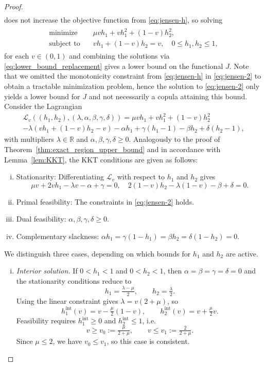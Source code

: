 \documentclass{article}
\newcommand{\1}{\mathds{1}}
\newcommand{\R}{\mathbb{R}}
\begin{document}
\begin{proof}
\begin{align}
\end{align}
does not increase the objective function from \eqref{eq:jensen-h}, so solving
\begin{align}\begin{aligned}\label{eq:jensen-2}
    \text{minimize} \quad & \mu v h_1 + v h_1^2 + (1-v)h_2^2, \\
    \text{subject to} \quad
    & v h_1 + (1-v) h_2 = v, \quad 0\le h_1, h_2 \le 1, 
\end{aligned}\end{align}
for each $v\in(0,1)$ and combining the solutions via \eqref{eq:lower_bound_replacement} gives a lower bound on the functional $J$.
Note that we omitted the monotonicity constraint from \eqref{eq:jensen-h} in \eqref{eq:jensen-2} to obtain a tractable minimization problem, hence the solution to \eqref{eq:jensen-2} only yields a lower bound for $J$ and not necessarily a copula attaining this bound.
Consider the Lagrangian
\begin{multline*}
\mathcal{L}_v((h_1,h_2),(\lambda,\alpha,\beta,\gamma,\delta))
= \mu v h_1 + v h_1^2 + (1-v) h_2^2 \\
- \lambda(v h_1+(1-v)h_2-v) - \alpha h_1 + \gamma(h_1-1) - \beta h_2 + \delta(h_2-1),
\end{multline*}
with multipliers $\lambda\in\R$ and $\alpha,\beta,\gamma,\delta\ge0$.
Analogously to the proof of Theorem~\ref{thm:exact_region_upper_bound} and in accordance with Lemma~\ref{lem:KKT}, the KKT conditions are given as follows:
\begin{enumerate}[(i)]
\item Stationarity: Differentiating $\mathcal{L}_v$ with respect to $h_1$ and $h_2$ gives
\[
\mu v + 2 v h_1 - \lambda v - \alpha + \gamma=0, 
\quad
2(1-v)h_2 - \lambda(1-v) - \beta + \delta=0.
\]
\item Primal feasibility: The constraints in \eqref{eq:jensen-2} holds.
\item Dual feasibility: $\alpha,\beta,\gamma,\delta\ge0$.
\item Complementary slackness: $\alpha h_1=\gamma(1-h_1)=\beta h_2=\delta(1-h_2)=0$.
\end{enumerate}
We distinguish three cases, depending on which bounds for $h_1$ and $h_2$ are active.
\begin{enumerate}[(i)]
\item \emph{Interior solution.}  
If $0<h_1<1$ and $0<h_2<1$, then $\alpha=\beta=\gamma=\delta=0$ and the 
stationarity conditions reduce to
\[
h_1=\tfrac{\lambda-\mu}{2}, \qquad h_2=\tfrac{\lambda}{2}.
\]
Using the linear constraint gives $\lambda=v(2+\mu)$, so
\[
h_1^{\mathrm{int}}(v)=v-\tfrac{\mu}{2}(1-v), 
\qquad 
h_2^{\mathrm{int}}(v)=v+\tfrac{\mu}{2}v.
\]
Feasibility requires $h_1^{\mathrm{int}}\ge 0$ and $h_2^{\mathrm{int}}\le 1$, i.e.
\[
v\ge v_0:=\tfrac{\mu}{2+\mu}, \qquad v\le v_1:=\tfrac{2}{2+\mu}.
\]
Since $\mu\le 2$, we have $v_0\le v_1$, so this case is consistent.


\end{enumerate}
\end{proof}
\end{document}

